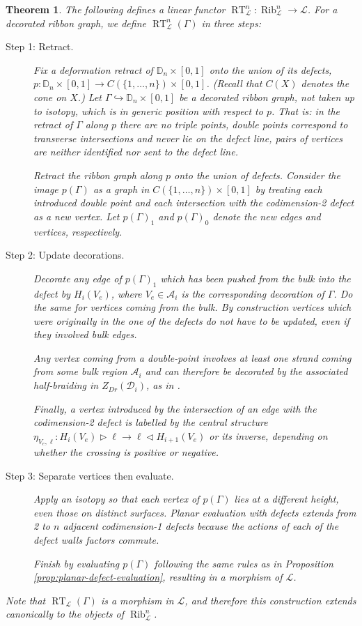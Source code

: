 \documentclass[a4paper]{article}
\numberwithin{equation}{section}
\newtheorem{theorem}[counter]{Theorem}
\newcommand{\1}{{\mathrm{1}\mkern-4mu{\mathchoice{}{}{\mskip-0.5mu}{\mskip-1mu}}\mathrm{l}}}
\newcommand{\DD}{\mathbb{D}}
\newcommand{\A}{\mathcal{A}}
\newcommand{\D}{\mathcal{D}}
\renewcommand{\L}{\mathcal{L}}
\DeclareMathOperator{\RT}{RT} %
\DeclareMathOperator{\Rib}{Rib}
\begin{document}
\begin{theorem}\label{thm:skein-evaluation}
The following defines a linear functor $\RT^n_\L : \Rib_\L^n \to \L$. For a decorated ribbon graph, we define $\RT^n_\L(\Gamma)$ in three steps:
\begin{description}
    \item[Step 1: Retract.]
    Fix a deformation retract of $\DD_n\times[0,1]$ onto the union of its defects, $p:\DD_n\times [0,1] \to C(\{1,\ldots,n\})\times[0,1]$. (Recall that $C(X)$ denotes the cone on $X$.)
    Let $\Gamma\hookrightarrow \DD_n\times[0,1]$ be a decorated ribbon graph, not taken up to isotopy, which is in generic position with respect to $p$.
    That is: in the retract of $\Gamma$ along $p$ there are no triple points, double points correspond to transverse intersections and never lie on the defect line, pairs of vertices are neither identified nor sent to the defect line. 
    
    Retract the ribbon graph along $p$ onto the union of defects.
    Consider the image $p(\Gamma)$ as a graph in $C(\{1,\ldots,n\})\times [0,1]$ by treating each introduced double point and each intersection with the codimension-2 defect as a new vertex. Let $p(\Gamma)_1$ and $p(\Gamma)_0$ denote the new edges and vertices, respectively.

    \item[Step 2: Update decorations.]
    Decorate any edge of $p(\Gamma)_1$ which has been pushed from the bulk into the defect by $H_i(V_e)$, where $V_e \in \A_i$ is the corresponding decoration of $\Gamma$. Do the same for vertices coming from the bulk.
    By construction vertices which were originally in the one of the defects do not have to be updated, even if they involved bulk edges.
    
    Any vertex coming from a double-point involves at least one strand coming from some bulk region $\A_i$ and can therefore be decorated by the associated half-braiding in $Z_{Dr}(\D_i)$, as in \cite{Brown_Jordan_2025}.
    
    Finally, a vertex introduced by the intersection of an edge with the codimension-2 defect is labelled by the central structure $\eta_{V_e,\ell} : H_i(V_e)\triangleright \ell \to \ell \triangleleft H_{i+1}(V_e)$ or its inverse, depending on whether the crossing is positive or negative.
    
    \item[Step 3: Separate vertices then evaluate.] Apply an isotopy so that each vertex of $p(\Gamma)$ lies at a different height, even those on distinct surfaces. Planar evaluation with defects extends from 2 to $n$ adjacent codimension-1 defects because the actions of each of the defect walls factors commute. 
    
    Finish by evaluating $p(\Gamma)$ following the same rules as in Proposition \ref{prop:planar-defect-evaluation}, resulting in a morphism of $\L$.
\end{description}

Note that $\RT_\L(\Gamma)$ is a morphism in $\L$, and therefore this construction extends canonically to the objects of $\Rib^n_\L$.
\end{theorem}
\end{document}
